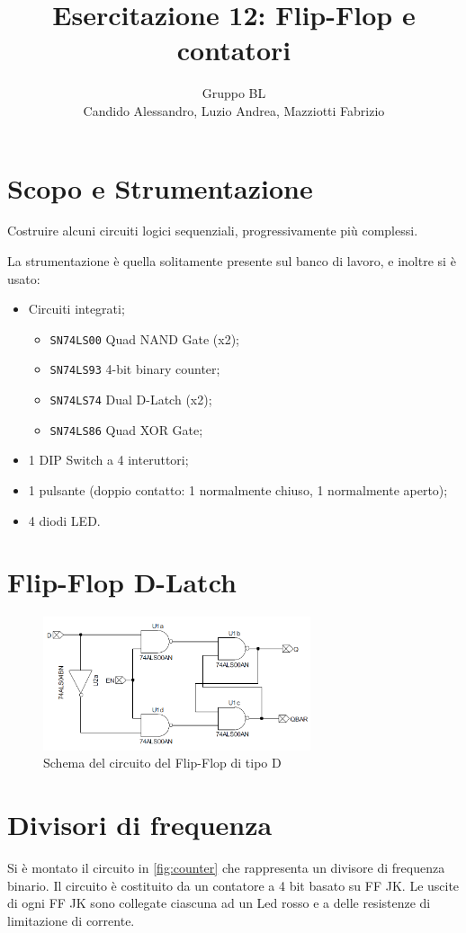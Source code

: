 \documentclass[a4paper,10pt]{article}
\title{Esercitazione 12: Flip-Flop e contatori}
\author{Gruppo BL \\ Candido Alessandro, Luzio Andrea, Mazziotti Fabrizio}
\def\code#1{\texttt{#1}}
\begin{document}
\maketitle

\section{Scopo e Strumentazione}
Costruire alcuni circuiti logici sequenziali, progressivamente
più complessi.

La strumentazione è quella solitamente presente sul banco di lavoro, e inoltre si è usato:
\begin{itemize}
	\item Circuiti integrati;
	\begin{itemize}
		\item \code{SN74LS00} Quad NAND Gate (x2);
		\item \code{SN74LS93} 4-bit binary counter;
		\item \code{SN74LS74} Dual D-Latch (x2);
		\item \code{SN74LS86} Quad XOR Gate;
	\end{itemize}
	\item 1 DIP Switch a 4 interuttori;
	\item 1 pulsante (doppio contatto: 1 normalmente chiuso, 1 normalmente aperto);
	\item 4 diodi LED.
\end{itemize}

\section{Flip-Flop D-Latch}

\begin{figure}[H]
	\centering
	\includegraphics[width=0.7\textwidth]{../grafici/FlipFlopD.png}
	\caption{Schema del circuito del Flip-Flop di tipo D}
	\label{fig:FFD}
\end{figure}

\section{Divisori di frequenza}
Si è montato il circuito in \cref{fig:counter} che rappresenta un divisore di frequenza binario.
Il circuito è costituito da un contatore a 4 bit basato su FF JK. Le uscite di ogni FF JK sono collegate
ciascuna ad un Led rosso e a delle resistenze di limitazione di corrente.
\end{document}
